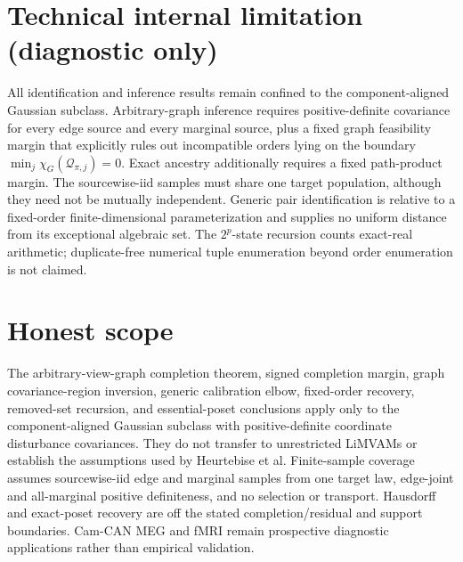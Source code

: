 \documentclass{article}
\begin{document}
\section*{Technical internal limitation (diagnostic only)}

All identification and inference results remain confined to the component-aligned Gaussian subclass. Arbitrary-graph inference requires positive-definite covariance for every edge source and every marginal source, plus a fixed graph feasibility margin that explicitly rules out incompatible orders lying on the boundary \(\min_j\chi_G(\mathcal Q_{\pi,j})=0\). Exact ancestry additionally requires a fixed path-product margin. The sourcewise-iid samples must share one target population, although they need not be mutually independent. Generic pair identification is relative to a fixed-order finite-dimensional parameterization and supplies no uniform distance from its exceptional algebraic set. The \(2^p\)-state recursion counts exact-real arithmetic; duplicate-free numerical tuple enumeration beyond order enumeration is not claimed.

\section{Honest scope}

The arbitrary-view-graph completion theorem, signed completion margin, graph covariance-region inversion, generic calibration elbow, fixed-order recovery, removed-set recursion, and essential-poset conclusions apply only to the component-aligned Gaussian subclass with positive-definite coordinate disturbance covariances. They do not transfer to unrestricted LiMVAMs or establish the assumptions used by Heurtebise et al. Finite-sample coverage assumes sourcewise-iid edge and marginal samples from one target law, edge-joint and all-marginal positive definiteness, and no selection or transport. Hausdorff and exact-poset recovery are off the stated completion/residual and support boundaries. Cam-CAN MEG and fMRI remain prospective diagnostic applications rather than empirical validation.
\end{document}
